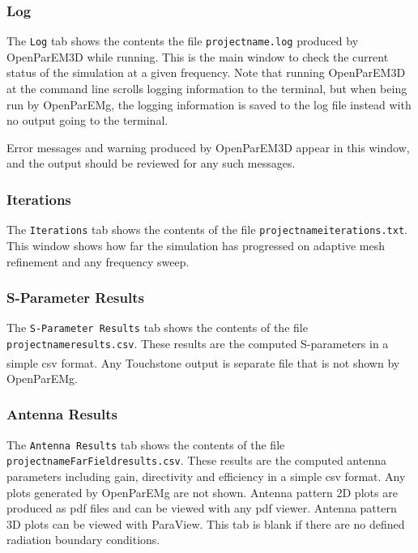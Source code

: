 \documentclass[titlepage]{article}
\renewcommand\_{\textunderscore\linebreak[1]}
\begin{document}
\subsubsection{Log}

The \texttt{Log} tab shows the contents the file \texttt{projectname.log} produced by OpenParEM3D while running.  This is the main window to check the current status of the simulation at a given frequency.  Note that running OpenParEM3D at the command line scrolls logging information to the terminal, but when being run by OpenParEMg, the logging information is saved to the log file instead with no output going to the terminal.

Error messages and warning produced by OpenParEM3D appear in this window, and the output should be reviewed for any such messages.

\subsubsection{Iterations}

The \texttt{Iterations} tab shows the contents of the file \texttt{projectname\_iterations.txt}.  This window shows how far the simulation has progressed on adaptive mesh refinement and any frequency sweep.

\subsubsection{S-Parameter Results}

The \texttt{S-Parameter Results} tab shows the contents of the file \texttt{projectname\_results.csv}.  These results are the computed S-parameters in a simple csv format.  Any Touchstone\textsuperscript{\textregistered} \cite{IBIS} output is separate file that is not shown by OpenParEMg.


\subsubsection{Antenna Results}

The \texttt{Antenna Results} tab shows the contents of the file \texttt{projectname\_FarField\_results.csv}.  These results are the computed antenna parameters including gain, directivity and efficiency in a simple csv format.  Any plots generated by OpenParEMg are not shown.  Antenna pattern 2D plots are produced as pdf files and can be viewed with any pdf viewer.  Antenna pattern 3D plots can be viewed with ParaView.  This tab is blank if there are no defined radiation boundary conditions.
\end{document}
